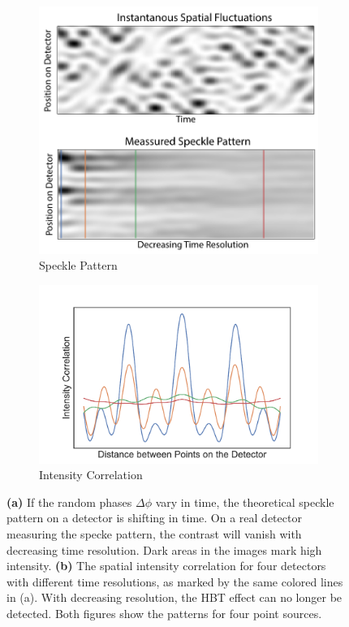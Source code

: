 \begin{figure}
	\centering
	\begin{subfigure}[b]{0.42\linewidth}
		\includegraphics[width=\linewidth]{images/specklecontrast.pdf}
		\caption{Speckle Pattern}
	\end{subfigure}
	\begin{subfigure}[b]{0.42\linewidth}
	\includegraphics[width=\linewidth]{images/contrastcorr.pdf}
	\caption{Intensity Correlation}
\end{subfigure}
\caption[Time resolution of the detector in HBT]{\textbf{(a)} If the random phases $\Delta \phi$ vary in time, the theoretical speckle pattern on a detector is shifting in time. On a real detector measuring the specke pattern, the contrast will vanish with decreasing time resolution.  Dark areas in the images mark high intensity. \textbf{(b)} The spatial intensity correlation for four detectors with different time  resolutions, as marked by the same colored lines in (a). With decreasing resolution, the HBT effect can no longer be detected. Both figures show the patterns for four point sources.}
\label{fig:contrasthbt}
\end{figure}
